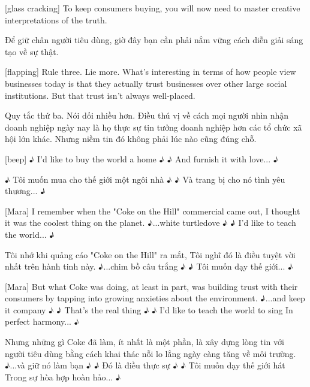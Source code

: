 \documentclass[a4paper]{article}
\begin{document}
	[glass cracking]
	To keep consumers buying, you will now need to master creative interpretations of the truth.
	
	\begin{vietnamese-v2}
		Để giữ chân người tiêu dùng, giờ đây bạn cần phải nắm vững cách diễn giải sáng tạo về sự thật.
	\end{vietnamese-v2}
	
	[flapping]
	Rule three. Lie more.
	What's interesting in terms of how people view businesses today is that they actually trust businesses over other large social institutions.
	But that trust isn't always well-placed.
	
	\begin{vietnamese-v2}
		[vỗ tay]
		Quy tắc thứ ba. Nói dối nhiều hơn.
		Điều thú vị về cách mọi người nhìn nhận doanh nghiệp ngày nay là họ thực sự tin tưởng doanh nghiệp hơn các tổ chức xã hội lớn khác.
		Nhưng niềm tin đó không phải lúc nào cũng đúng chỗ.
	\end{vietnamese-v2}
	
	[beep]
	♪ I'd like to buy the world a home ♪
	♪ And furnish it with love... ♪
	
	\begin{vietnamese-v2}
		[bíp]
		♪ Tôi muốn mua cho thế giới một ngôi nhà ♪
		♪ Và trang bị cho nó tình yêu thương... ♪
	\end{vietnamese-v2}
	
	[Mara] I remember when the "Coke on the Hill" commercial came out,
	I thought it was the coolest thing on the planet.
	♪...white turtledove ♪
	♪ I'd like to teach the world... ♪
	
	\begin{vietnamese-v2}
		[Mara] Tôi nhớ khi quảng cáo "Coke on the Hill" ra mắt,
		Tôi nghĩ đó là điều tuyệt vời nhất trên hành tinh này.
		♪...chim bồ câu trắng ♪
		♪ Tôi muốn dạy thế giới... ♪
	\end{vietnamese-v2}
	
	[Mara] But what Coke was doing, at least in part, was building trust with their consumers by tapping into growing anxieties about the environment.
	♪...and keep it company ♪
	♪ That's the real thing ♪
	♪ I'd like to teach the world to sing In perfect harmony... ♪
	
	\begin{vietnamese-v2}
		[Mara] Nhưng những gì Coke đã làm, ít nhất là một phần, là xây dựng lòng tin với người tiêu dùng bằng cách khai thác nỗi lo lắng ngày càng tăng về môi trường.
		♪...và giữ nó làm bạn ♪
		♪ Đó là điều thực sự ♪
		♪ Tôi muốn dạy thế giới hát Trong sự hòa hợp hoàn hảo... ♪
	\end{vietnamese-v2}
	
\end{document}
